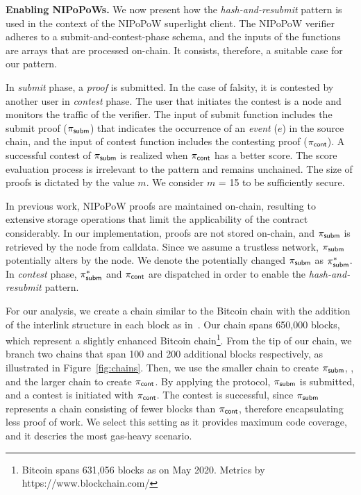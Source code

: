 \noindent \textbf{Enabling NIPoPoWs.} We now present how the
\emph{hash-and-resubmit} pattern is used in the context of the NIPoPoW
superlight client. The NIPoPoW verifier adheres to a submit-and-contest-phase
schema, and the inputs of the functions are arrays that are processed on-chain.
It consists, therefore, a suitable case for our pattern.

In \emph{submit} phase, a \emph{proof} is submitted. In the case of
falsity, it is contested by another user in \emph{contest} phase. The user that
initiates the contest is a node and monitors the traffic of the verifier.  The
input of \textsf{submit} function includes the submit proof ($\mathsf{\pi_{subm}}$) that
indicates the occurrence of an \emph{event} ($e$) in the source chain, and the
input of \textsf{contest} function includes the contesting proof ($\mathsf{\pi_{cont}}$). A
successful contest of $\mathsf{\pi_{subm}}$ is realized when $\mathsf{\pi_{cont}}$ has a better score. The
score evaluation process is irrelevant to the pattern and remains unchained.
The size of proofs is dictated by the value $m$. We consider $m$ = 15 to be
sufficiently secure.

In previous work, NIPoPoW proofs are maintained on-chain, resulting to
extensive storage operations that limit the applicability of the contract
considerably. In our implementation, proofs are not stored on-chain, and $\mathsf{\pi_{subm}}$
is retrieved by the node from calldata. Since we assume a trustless network,
$\mathsf{\pi_{subm}}$ potentially alters by the node. We denote the potentially changed $\mathsf{\pi_{subm}}$
as $\mathsf{\pi_{subm}^*}$. In \emph{contest} phase, $\mathsf{\pi_{subm}^*}$ and $\mathsf{\pi_{cont}}$ are dispatched in order
to enable the \emph{hash-and-resubmit} pattern.

For our analysis, we create a chain similar to the Bitcoin chain with the
addition of the interlink structure in each block as in~\cite{gglou}. Our chain
spans 650,000 blocks, which represent a slightly enhanced Bitcoin
chain\footnote{Bitcoin spans 631,056 blocks as on May 2020. Metrics by
https://www.blockchain.com/}. From the tip of our chain, we branch two chains
that span 100 and 200 additional blocks respectively, as illustrated in
Figure~\ref{fig:chains}. Then, we use the smaller chain to create  $\mathsf{\pi_{subm}}$, ,
and the larger chain to create $\mathsf{\pi_{cont}}$. By applying the protocol, $\mathsf{\pi_{subm}}$ is
submitted, and a contest is initiated with $\mathsf{\pi_{cont}}$. The contest is successful,
since $\mathsf{\pi_{subm}}$ represents a chain consisting of fewer blocks than $\mathsf{\pi_{cont}}$,
therefore encapsulating less proof of work. We select this setting as it
provides maximum code coverage, and it descries the most gas-heavy scenario.

